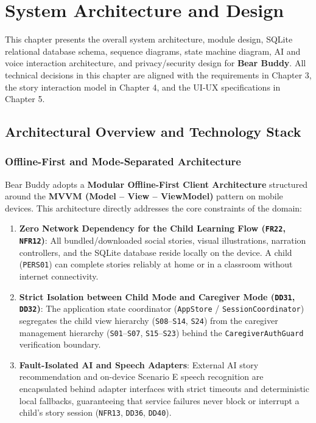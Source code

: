 \chapter{System Architecture and Design}


This chapter presents the overall system architecture, module design, SQLite relational database schema, sequence diagrams, state machine diagram, AI and voice interaction architecture, and privacy/security design for \textbf{Bear Buddy}. All technical decisions in this chapter are aligned with the requirements in Chapter 3, the story interaction model in Chapter 4, and the UI-UX specifications in Chapter 5.


\section{Architectural Overview and Technology Stack}



\subsection{Offline-First and Mode-Separated Architecture}


Bear Buddy adopts a \textbf{Modular Offline-First Client Architecture} structured around the \textbf{MVVM (Model – View – ViewModel)} pattern on mobile devices. This architecture directly addresses the core constraints of the domain:

\begin{enumerate}
  \item \textbf{Zero Network Dependency for the Child Learning Flow (\texttt{FR22}, \texttt{NFR12})}: All bundled/downloaded social stories, visual illustrations, narration controllers, and the SQLite database reside locally on the device. A child (\texttt{PERS01}) can complete stories reliably at home or in a classroom without internet connectivity.
  \item \textbf{Strict Isolation between Child Mode and Caregiver Mode (\texttt{DD31}, \texttt{DD32})}: The application state coordinator (\texttt{AppStore} / \texttt{SessionCoordinator}) segregates the child view hierarchy (\texttt{S08}–\texttt{S14}, \texttt{S24}) from the caregiver management hierarchy (\texttt{S01}–\texttt{S07}, \texttt{S15}–\texttt{S23}) behind the \texttt{CaregiverAuthGuard} verification boundary.
  \item \textbf{Fault-Isolated AI and Speech Adapters}: External AI story recommendation and on-device Scenario E speech recognition are encapsulated behind adapter interfaces with strict timeouts and deterministic local fallbacks, guaranteeing that service failures never block or interrupt a child's story session (\texttt{NFR13}, \texttt{DD36}, \texttt{DD40}).
\end{enumerate}



